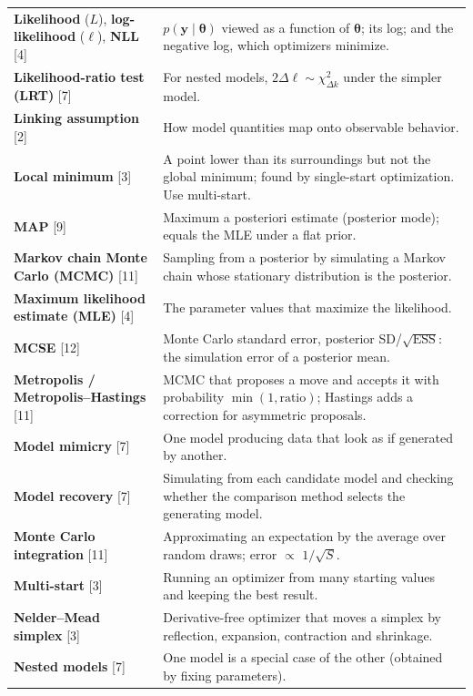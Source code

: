 \begin{longtable}[]{@{}
  >{\raggedright\arraybackslash}p{}
  >{\raggedright\arraybackslash}p{}@{}}
\textbf{Likelihood} (\(L\)), \textbf{log-likelihood} (\(\ell\)),
\textbf{NLL} {[}4{]} & \(p(\mathbf{y}\mid\boldsymbol\theta)\) viewed as
a function of \(\boldsymbol\theta\); its log; and the negative log,
which optimizers minimize. \\
\textbf{Likelihood-ratio test (LRT)} {[}7{]} & For nested models,
\(2\Delta\ell \sim \chi^2_{\Delta k}\) under the simpler model. \\
\textbf{Linking assumption} {[}2{]} & How model quantities map onto
observable behavior. \\
\textbf{Local minimum} {[}3{]} & A point lower than its surroundings but
not the global minimum; found by single-start optimization. Use
multi-start. \\
\textbf{MAP} {[}9{]} & Maximum a posteriori estimate (posterior mode);
equals the MLE under a flat prior. \\
\textbf{Markov chain Monte Carlo (MCMC)} {[}11{]} & Sampling from a
posterior by simulating a Markov chain whose stationary distribution is
the posterior. \\
\textbf{Maximum likelihood estimate (MLE)} {[}4{]} & The parameter
values that maximize the likelihood. \\
\textbf{MCSE} {[}12{]} & Monte Carlo standard error, posterior
SD/\(\sqrt{\mathrm{ESS}}\): the simulation error of a posterior mean. \\
\textbf{Metropolis / Metropolis--Hastings} {[}11{]} & MCMC that proposes
a move and accepts it with probability \(\min(1, \text{ratio})\);
Hastings adds a correction for asymmetric proposals. \\
\textbf{Model mimicry} {[}7{]} & One model producing data that look as
if generated by another. \\
\textbf{Model recovery} {[}7{]} & Simulating from each candidate model
and checking whether the comparison method selects the generating
model. \\
\textbf{Monte Carlo integration} {[}11{]} & Approximating an expectation
by the average over random draws; error \ensuremath{\propto} \(1/\sqrt{S}\). \\
\textbf{Multi-start} {[}3{]} & Running an optimizer from many starting
values and keeping the best result. \\
\textbf{Nelder--Mead simplex} {[}3{]} & Derivative-free optimizer that
moves a simplex by reflection, expansion, contraction and shrinkage. \\
\textbf{Nested models} {[}7{]} & One model is a special case of the
other (obtained by fixing parameters). \\

\end{longtable}
